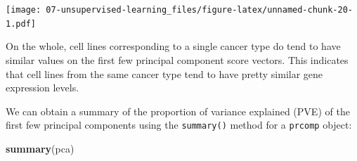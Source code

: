 \documentclass[
  openany]{book}
\newenvironment{Shaded}{\begin{snugshade}}{\end{snugshade}}
\newcommand{\KeywordTok}[1]{\textcolor[rgb]{0.13,0.29,0.53}{\textbf{#1}}}
\newcommand{\NormalTok}[1]{#1}
\begin{document}
\texttt{[image: 07-unsupervised-learning\_files/figure-latex/unnamed-chunk-20-1.pdf]}

On the whole, cell lines corresponding to a single cancer type do tend to have similar values on the
first few principal component score vectors. This indicates that cell lines
from the same cancer type tend to have pretty similar gene expression
levels.

We can obtain a summary of the proportion of variance explained (PVE)
of the first few principal components using the \texttt{summary()} method for a
\texttt{prcomp} object:

\begin{Shaded}
\begin{Highlighting}[]
\KeywordTok{summary}\NormalTok{(pca)}
\end{Highlighting}
\end{Shaded}
\end{document}
